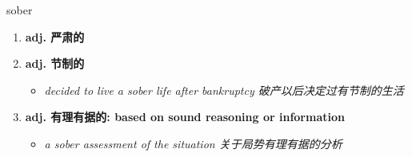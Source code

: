 
\begin{frame}
{\huge sober}
\begin{center}
\begin{enumerate}\Large
  \item \textbf{adj. 严肃的}
  \item \textbf{adj. 节制的}
  \begin{itemize}
    \item \em{\Large{decided to live a sober life after bankruptcy 破产以后决定过有节制的生活}}
  \end{itemize}
  \item \textbf{adj. 有理有据的: based on sound reasoning or information}
  \begin{itemize}
    \item \em{\Large{a sober assessment of the situation 关于局势有理有据的分析}}
  \end{itemize}
\end{enumerate}
\end{center}
\end{frame}
